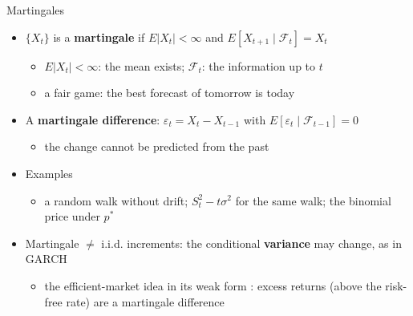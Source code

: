 \begin{frame}{Martingales}
\itemsize{\footnotesize}
\begin{itemize}
    \item $\{X_t\}$ is a \textbf{martingale} if $E|X_t| < \infty$ and $E[X_{t+1} \mid \mathcal{F}_t] = X_t$
    \begin{itemize}
        \item $E|X_t| < \infty$: the mean exists; $\mathcal{F}_t$: the information up to $t$
        \item a fair game: the best forecast of tomorrow is today
    \end{itemize}
    \item A \textbf{martingale difference}: $\varepsilon_t = X_t - X_{t-1}$ with $E[\varepsilon_t \mid \mathcal{F}_{t-1}] = 0$
    \begin{itemize}
        \item the change cannot be predicted from the past
    \end{itemize}
    \item Examples
    \begin{itemize}
        \item a random walk without drift; $S_t^2 - t\sigma^2$ for the same walk; the binomial price under $p^*$
    \end{itemize}
    \item Martingale $\ne$ i.i.d. increments: the conditional \textbf{variance} may change, as in GARCH
    \begin{itemize}
        \item the efficient-market idea in its weak form : excess returns (above the risk-free rate) are a martingale difference
    \end{itemize}
\end{itemize}
\end{frame}

